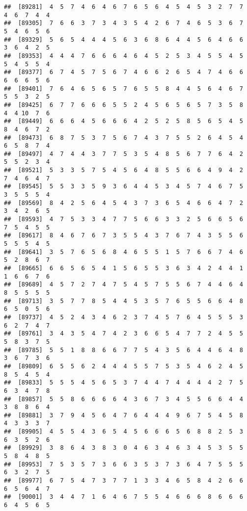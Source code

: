 \documentclass[
]{book}
\begin{document}
\begin{verbatim}
##  [89281]  4  5  7  4  6  4  6  7  6  5  6  4  5  4  5  3  2  7  7  4  6  7  4  4
##  [89305]  7  6  6  3  7  3  4  3  5  4  2  6  7  4  6  5  3  6  7  5  4  6  5  6
##  [89329]  5  6  5  4  4  4  5  6  3  6  8  6  4  4  5  6  4  6  6  3  6  4  2  5
##  [89353]  4  4  4  7  6  6  6  4  6  4  5  2  5  3  4  5  5  4  5  5  4  5  5  4
##  [89377]  6  7  4  5  7  5  6  7  4  6  6  2  6  5  4  7  4  6  6  6  6  6  5  6
##  [89401]  7  6  4  6  5  6  5  7  6  5  5  8  4  4  5  6  4  6  7  5  5  3  2  5
##  [89425]  6  7  7  6  6  6  5  5  2  4  5  6  5  6  5  7  3  5  8  4  4 10  7  6
##  [89449]  6  6  6  4  5  6  6  6  4  2  5  2  5  8  5  6  5  4  5  8  4  6  7  2
##  [89473]  6  8  7  5  3  7  5  6  7  4  3  7  5  5  2  6  4  5  4  6  5  8  7  4
##  [89497]  4  7  4  4  3  7  7  5  3  5  4  8  5  6  7  7  6  4  2  5  5  2  3  4
##  [89521]  5  3  3  5  7  5  4  5  6  4  8  5  5  6  6  4  9  4  2  7  4  6  4  7
##  [89545]  5  5  3  3  5  9  3  6  4  4  5  3  4  5  7  4  6  7  5  3  5  5  5  4
##  [89569]  8  4  2  5  6  4  5  4  3  7  3  6  5  4  6  6  4  7  2  3  4  2  6  5
##  [89593]  4  7  5  3  3  4  7  7  5  6  6  3  3  2  5  6  6  5  6  7  5  4  5  5
##  [89617]  8  4  6  7  6  7  3  5  5  4  3  7  6  7  4  3  5  5  6  5  5  5  4  5
##  [89641]  3  5  7  6  5  6  8  4  6  5  5  1  5  7  6  6  7  4  6  5  2  8  6  7
##  [89665]  6  6  5  6  5  4  1  5  6  5  5  3  6  3  4  2  4  4  1  1  6  6  7  6
##  [89689]  4  5  7  2  7  4  7  5  4  5  7  5  5  6  7  4  4  6  4  8  5  5  5  5
##  [89713]  3  5  7  7  8  5  4  4  5  3  5  7  6  5  5  6  6  4  8  6  5  0  5  6
##  [89737]  4  5  2  4  3  4  6  2  3  7  4  5  7  6  4  5  5  5  3  6  2  7  4  7
##  [89761]  3  4  3  5  4  7  4  2  3  6  6  5  4  7  7  2  4  5  5  5  8  3  7  5
##  [89785]  5  5  1  8  8  6  6  7  7  5  4  3  5  6  4  4  6  4  8  3  6  7  3  6
##  [89809]  6  5  5  6  2  4  4  4  5  5  7  5  3  5  4  6  2  4  5  8  5  4  5  4
##  [89833]  5  5  5  4  5  6  5  3  7  4  4  7  4  4  4  4  2  7  5  6  3  4  7  8
##  [89857]  5  5  8  6  6  6  6  4  3  6  7  3  4  5  5  6  6  4  4  3  8  8  6  4
##  [89881]  3  7  9  4  5  6  4  7  6  4  4  4  9  6  7  5  4  5  8  4  3  3  3  7
##  [89905]  4  5  5  4  3  6  5  4  5  6  6  6  5  6  8  8  2  5  3  6  3  5  2  6
##  [89929]  3  8  6  4  3  8  3  0  4  6  3  4  6  3  4  5  3  5  5  5  8  4  8  5
##  [89953]  7  5  3  5  7  3  6  6  3  5  3  7  3  6  4  7  5  5  5  6  3  2  7  5
##  [89977]  6  7  5  4  7  3  7  7  1  3  3  4  6  5  8  4  2  6  6  6  5  6  4  7
##  [90001]  3  4  4  7  1  6  4  6  7  5  5  4  6  6  6  8  6  6  6  6  4  5  6  5

\end{verbatim}
\end{document}
